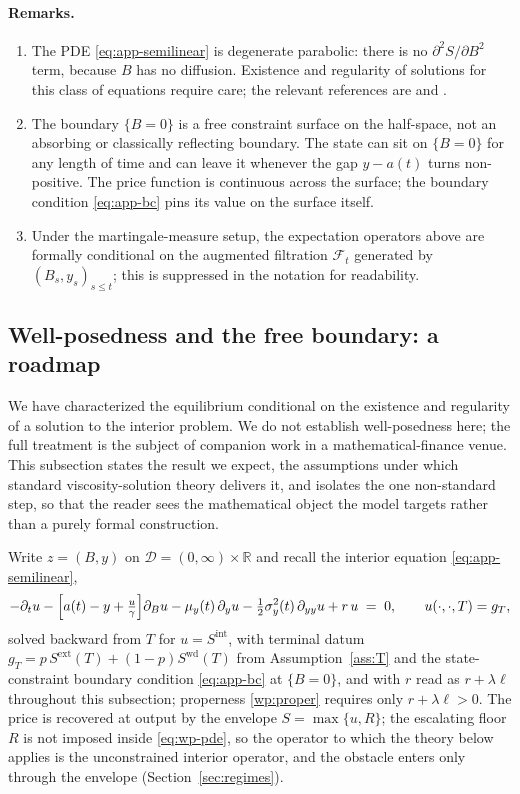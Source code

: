 \documentclass[11pt,letterpaper]{article}
\theoremstyle{plain}
\theoremstyle{definition}
\newcommand{\Filt}{\mathcal{F}}              %
\newcommand{\R}{\mathbb{R}}
\numberwithin{equation}{section}
\begin{document}
\paragraph{Remarks.}
\begin{enumerate}[label=(R.\arabic*)]
  \item The PDE \eqref{eq:app-semilinear} is degenerate parabolic: there is no $\partial^2 S/\partial B^2$ term, because $B$ has no diffusion. Existence and regularity of solutions for this class of equations require care; the relevant references are \citet{bensoussan1982} and \citet{pham2009}.
  \item The boundary $\{B=0\}$ is a free constraint surface on the half-space, not an absorbing or classically reflecting boundary. The state can sit on $\{B=0\}$ for any length of time and can leave it whenever the gap $y-a(t)$ turns non-positive. The price function is continuous across the surface; the boundary condition \eqref{eq:app-bc} pins its value on the surface itself.
  \item Under the martingale-measure setup, the expectation operators above are formally conditional on the augmented filtration $\Filt_t$ generated by $(B_s,y_s)_{s\le t}$; this is suppressed in the notation for readability.
\end{enumerate}

\subsection{Well-posedness and the free boundary: a roadmap}\label{subsec:wellposedness}

We have characterized the equilibrium conditional on the existence and regularity of a solution
to the interior problem. We do not establish well-posedness here; the full treatment is the
subject of companion work in a mathematical-finance venue. This subsection states the result we
expect, the assumptions under which standard viscosity-solution theory delivers it, and isolates
the one non-standard step, so that the reader sees the mathematical object the model targets
rather than a purely formal construction.

Write $z=(B,y)$ on $\mathcal{D}=(0,\infty)\times\R$ and recall the interior equation
\eqref{eq:app-semilinear},
\begin{equation}\label{eq:wp-pde}
  -\partial_t u
  -\Bigl[a(t)-y+\tfrac{u}{\gamma}\Bigr]\partial_B u
  -\mu_y(t)\,\partial_y u
  -\tfrac12\sigma_y^2(t)\,\partial_{yy}u
  +r\,u \;=\;0,
  \qquad u(\cdot,\cdot,T)=g_T,
\end{equation}
solved backward from $T$ for $u=S^{\mathrm{int}}$, with terminal datum
$g_T=p\,S^{\mathrm{ext}}(T)+(1-p)S^{\mathrm{wd}}(T)$ from Assumption~\ref{ass:T} and the state-constraint boundary condition \eqref{eq:app-bc} at $\{B=0\}$, and with $r$ read as $r+\lambda\ell$ throughout this subsection; properness \ref{wp:proper} requires only $r+\lambda\ell>0$. The price is recovered at output by the envelope $S=\max\{u,R\}$; the escalating floor $R$ is not imposed inside \eqref{eq:wp-pde}, so the operator to which the theory below applies is the unconstrained interior operator, and the obstacle enters only through the envelope (Section~\ref{sec:regimes}).
\end{document}
